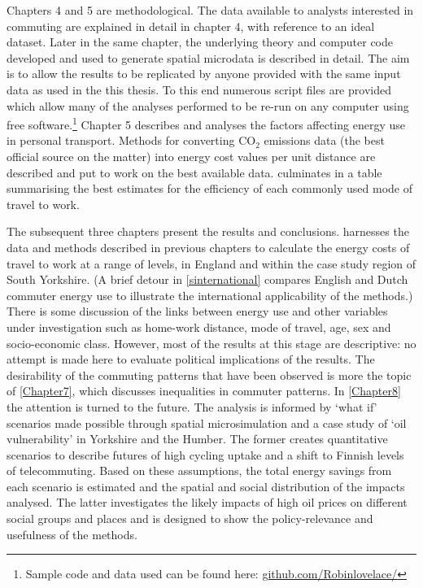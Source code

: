Chapters 4 and 5 are methodological. The data available to analysts interested
in commuting are explained in detail in chapter 4, with reference to an ideal
dataset. Later in the same chapter, the underlying theory and computer code
developed and
used to generate spatial microdata is described in detail. The aim is to allow the
results to be replicated by anyone provided with the same input data as used in
the this thesis. To this end numerous script files are provided which allow many
of the analyses performed to be re-run on any computer using free
software.\footnote{Sample code
and data used can be found here: {\color{blue}
\href{https://github.com/Robinlovelace/}
{github.com/Robinlovelace/}}
}
Chapter 5 describes and analyses the factors affecting energy use in personal
transport. Methods for converting CO$_2$ emissions data (the best official
source on the matter) into energy cost values per unit distance are described
and put to work on the best available data. 
culminates in a table summarising the best estimates for the
efficiency of each commonly used mode of travel to work.

The subsequent three chapters present the results and conclusions.
 harnesses the data and methods described in
previous chapters to
calculate the energy costs of travel to work at a range of levels, in England
and within the case study region of South Yorkshire. (A brief detour in
\cref{sinternational} compares English and Dutch commuter energy use
to illustrate the international applicability of the methods.) There is some discussion
of the links between energy use and other variables under investigation such as
home-work distance, mode of travel, age, sex and socio-economic class. However,
most of the results at this stage are descriptive: no
attempt is made here to evaluate political implications of the results. The
desirability of the commuting patterns that have been observed is more the
topic of \cref{Chapter7}, which discusses inequalities in commuter patterns.
In \cref{Chapter8} the attention is turned to the future. The analysis
is informed by `what if' scenarios made possible through spatial microsimulation
and a case study of `oil vulnerability' in Yorkshire and the
Humber.
The former creates quantitative scenarios to describe futures
of high cycling uptake and a shift to Finnish levels of telecommuting.
Based on these assumptions, the total energy savings from each scenario is
estimated and the spatial and social distribution of the impacts
analysed. 
The latter investigates the likely impacts of high oil prices on
different social groups and places and is designed to show the policy-relevance
and usefulness of the methods.

